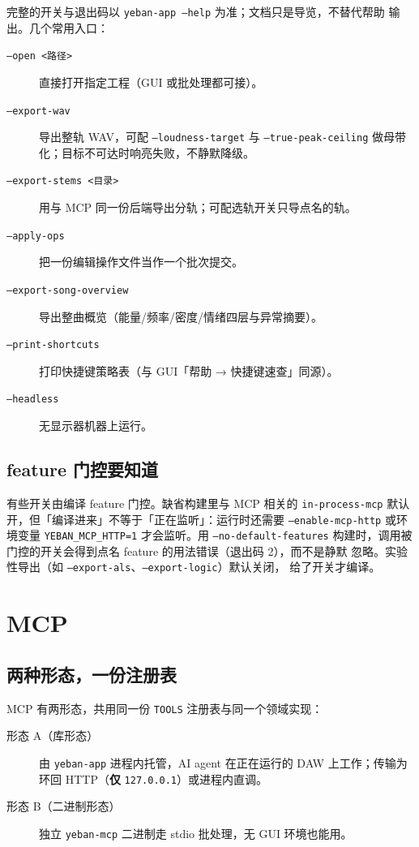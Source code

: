 完整的开关与退出码以 \texttt{yeban-app --help} 为准；文档只是导览，不替代帮助
输出。几个常用入口：

\begin{description}
  \item[\texttt{--open <路径>}] 直接打开指定工程（GUI 或批处理都可接）。
  \item[\texttt{--export-wav}] 导出整轨 WAV，可配 \texttt{--loudness-target} 与 \texttt{--true-peak-ceiling} 做母带化；目标不可达时响亮失败，不静默降级。
  \item[\texttt{--export-stems <目录>}] 用与 MCP 同一份后端导出分轨；可配选轨开关只导点名的轨。
  \item[\texttt{--apply-ops}] 把一份编辑操作文件当作一个批次提交。
  \item[\texttt{--export-song-overview}] 导出整曲概览（能量/频率/密度/情绪四层与异常摘要）。
  \item[\texttt{--print-shortcuts}] 打印快捷键策略表（与 GUI「帮助 → 快捷键速查」同源）。
  \item[\texttt{--headless}] 无显示器机器上运行。
\end{description}

\subsection{feature 门控要知道}

有些开关由编译 feature 门控。缺省构建里与 MCP 相关的 \texttt{in-process-mcp}
默认开，但「编译进来」不等于「正在监听」：运行时还需要 \texttt{--enable-mcp-http}
或环境变量 \texttt{YEBAN\_MCP\_HTTP=1} 才会监听。用 \texttt{--no-default-features}
构建时，调用被门控的开关会得到点名 feature 的用法错误（退出码 2），而不是静默
忽略。实验性导出（如 \texttt{--export-als}、\texttt{--export-logic}）默认关闭，
给了开关才编译。

\section{MCP}

\subsection{两种形态，一份注册表}

MCP 有两形态，共用同一份 \texttt{TOOLS} 注册表与同一个领域实现：

\begin{description}
  \item[形态 A（库形态）] 由 \texttt{yeban-app} 进程内托管，AI agent 在正在运行的 DAW 上工作；传输为环回 HTTP（\textbf{仅} \texttt{127.0.0.1}）或进程内直调。
  \item[形态 B（二进制形态）] 独立 \texttt{yeban-mcp} 二进制走 stdio 批处理，无 GUI 环境也能用。
\end{description}

